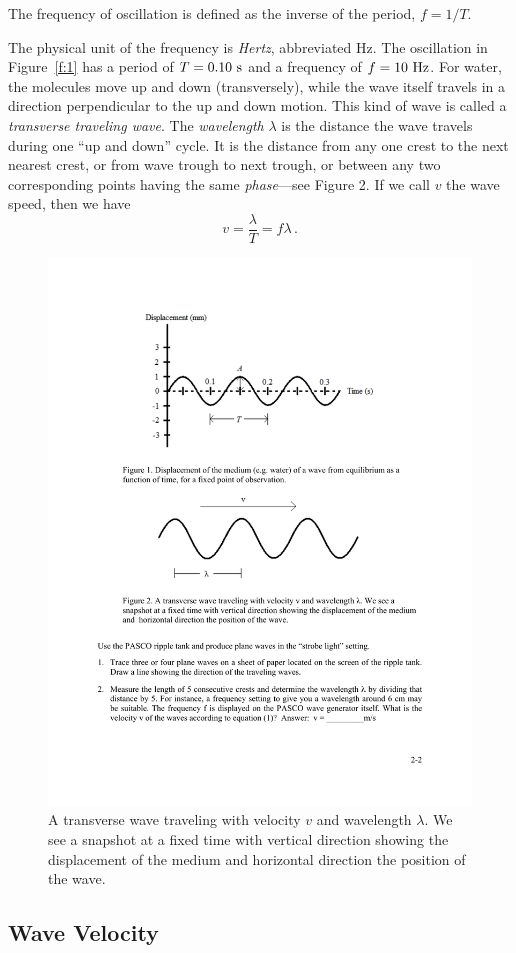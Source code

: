 \documentclass[11pt]{NSF}
\def\be{\begin{equation}}
\def\ee{\end{equation}}
\begin{document}
The frequency of oscillation is defined as the inverse of the period,
$f=1/T$.

The physical unit of the frequency is {\em Hertz}, abbreviated Hz. 
The oscillation in Figure~\ref{f:1} 
has a period of $T = 0.10~{\rm s}$ and a frequency of $f = 10~{\rm Hz}$. 
For water, the molecules move up and down (transversely), while the wave 
itself travels in a direction perpendicular to the up and down motion. 
This kind of wave is called a {\em transverse traveling wave}. 
The {\em wavelength} $\lambda$ is the distance the wave travels 
during one ``up and down” cycle. 
It is the distance from any one crest
to the next nearest crest, or from wave trough to next trough, or between any
two corresponding points having the same {\em phase}---see Figure 2. 
If we call $v$ the wave speed, then we have
\be
v = \frac{\lambda}{T} = f\lambda\,.
\label{e:v=f*lambda}
\ee
%
\begin{figure}[hbtp]
\begin{center}
\includegraphics[width=.6\textwidth]{fig2_2}
\caption{A transverse wave traveling with velocity $v$ and wavelength 
$\lambda$. 
We see a snapshot at a fixed time with vertical direction 
showing the displacement of
the medium and horizontal direction the position of the wave.}
\label{f:2}
\end{center}
\end{figure}
%

\subsection{Wave Velocity}
\end{document}
